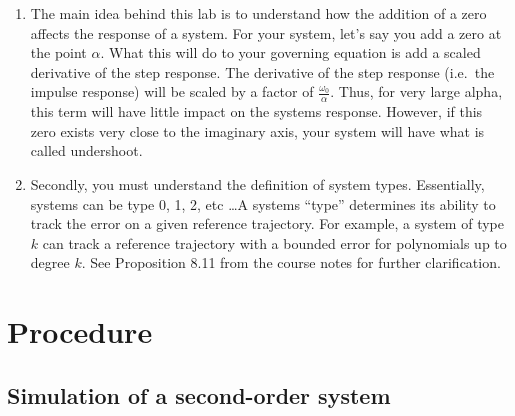 \begin{enumerate}
    \item The main idea behind this lab is to understand how the addition of a zero
          affects the response of a system. For your system, let's say you add a zero at the
          point \(\alpha \). What this will do to your governing equation is add a scaled derivative
          of the step response. The derivative of the step response (i.e.\ the impulse response)
          will be scaled by a factor of \(\frac{\omega_0}{\alpha} \). Thus, for very large alpha,
          this term will have little impact on the systems response. However, if this zero exists
          very close to the imaginary axis, your system will have what is called undershoot.
    \item Secondly, you must understand the definition of system types. Essentially,
          systems can be type 0, 1, 2, etc \ldots A systems ``type'' determines its ability to track
          the error on a given reference trajectory. For example, a system of type \(k \) can track
          a reference trajectory with a bounded error for polynomials up to degree \(k \). See Proposition
          8.11 from the course notes for further clarification.


\end{enumerate}

\section{Procedure}

\subsection{Simulation of a second-order system}\label{subsec:simulation}

